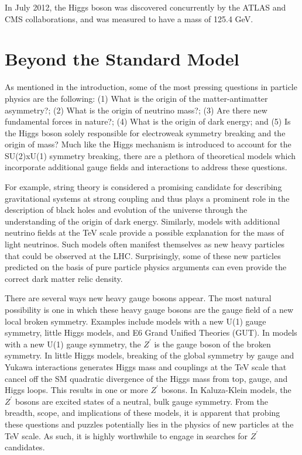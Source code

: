 In July 2012, the Higgs boson was discovered concurrently by the ATLAS and CMS collaborations, and was measured to have a mass of 125.4 GeV.~\cite{CMSHiggs}~\cite{ATLASHiggs}

\chapter{Beyond the Standard Model}


As mentioned in the introduction, some of the most pressing questions in particle physics are the following: (1) What is the origin of the matter-antimatter asymmetry?; (2) What is the origin of neutrino mass?; (3) Are there new fundamental forces in nature?; (4) What is the origin of dark energy; and (5) Is the Higgs boson solely responsible for electroweak symmetry breaking and the origin of mass? Much like the Higgs mechanism is introduced to account for the SU(2)xU(1) 
symmetry breaking, there are a plethora of theoretical models which incorporate additional gauge fields and interactions to address these questions. 

For example, string theory is considered a promising candidate for describing gravitational systems at strong coupling and thus plays a prominent role in the description of black holes and evolution of the universe through the understanding of the origin of dark energy. Similarly, models with additional neutrino fields at the TeV scale provide a possible explanation for the mass of light neutrinos. Such models often manifest themselves as new heavy particles that could be observed at the LHC. Surprisingly, some of these new particles predicted on the basis of pure particle physics arguments can even provide the correct dark matter relic density. 

There are several ways new heavy gauge bosons appear. The most natural possibility is one in which these heavy gauge bosons are the gauge field of a new local broken symmetry. Examples include models with a new U(1) gauge symmetry, little Higgs models, and E6 Grand Unified Theories (GUT). In models with a new U(1) gauge symmetry, the $Z^\prime$ is the gauge boson of the broken symmetry. In little Higgs models, breaking of the global symmetry by gauge and Yukawa interactions generates Higgs mass and couplings at the TeV scale that cancel off the SM quadratic divergence of the Higgs mass from top, gauge, and Higgs loops. This results in one or more $Z^\prime$ bosons. In Kaluza-Klein models, the $Z^\prime$ bosons are excited states of a neutral, bulk gauge symmetry. From the breadth, scope, and implications of these models, it is apparent that probing these questions and puzzles potentially lies in the physics of new
particles at the TeV scale. As such, it is highly worthwhile to engage in searches for $Z^\prime$ candidates.

